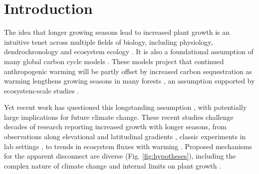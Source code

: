 \documentclass[11pt]{article}
\begin{document}
\section*{Introduction} %

The idea that longer growing seasons lead to increased plant growth is an intuitive tenet across multiple fields of biology, including physiology, dendrochronology and ecosystem ecology \citep{nobel1983biophysical,frank2022dendrochronology}. It is also a foundational assumption of many global carbon cycle models \citep[e.g.][]{ito2020global,friedlingstein2022global}. These models project that continued anthropogenic warming will be partly offset by increased carbon sequestration as warming lengthens growing seasons in many forests \citep{friedlingstein2022global}, an assumption supported by ecosystem-scale studies \citep{chen1999effects,keenan2014net,finzi2020}. 

Yet recent work has questioned this longstanding assumption \citep[e.g.][]{dow2022warm,green2022limits,silvestro2023longer}, with potentially large implications for future climate change. %
These recent studies challenge decades of research reporting increased growth with longer seasons, from observations along elevational and latitudinal gradients \citep[][]{myneni1997increased,berdanier2011growing,king2013tree,cuapio2022there}, classic experiments in lab settings \citep{went1957experimental}, to trends in ecosystem fluxes with warming \citep{chen1999effects,keenan2014net,finzi2020}. Proposed mechanisms for the apparent disconnect are diverse (Fig. \ref{fig:hypotheses}), including the complex nature of climate change \citep[e.g. drought or heat stress,][]{dow2022warm} and internal limits on plant growth  \citep{zohner2023effect}. %
\end{document}
